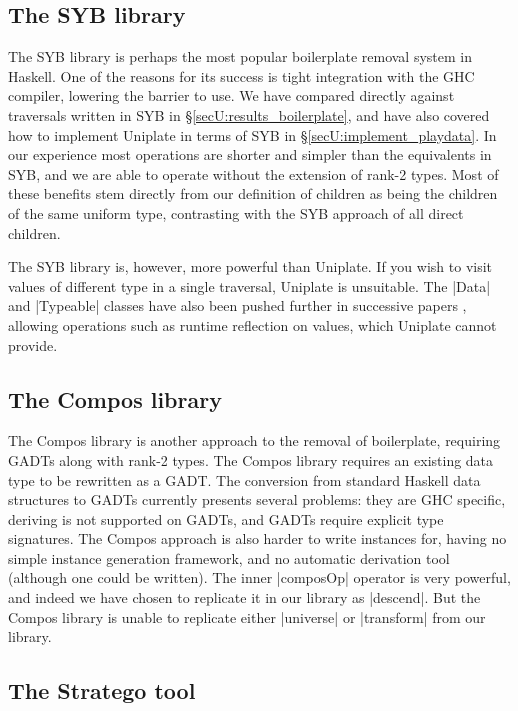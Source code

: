 \subsection{The SYB library}

The SYB library \citep{lammel:syb} is perhaps the most popular boilerplate removal system in Haskell. One of the reasons for its success is tight integration with the GHC compiler, lowering the barrier to use. We have compared directly against traversals written in SYB in \S\ref{secU:results_boilerplate}, and have also covered how to implement Uniplate in terms of SYB in \S\ref{secU:implement_playdata}. In our experience most operations are shorter and simpler than the equivalents in SYB, and we are able to operate without the extension of rank-2 types. Most of these benefits stem directly from our definition of children as being the children of the same uniform type, contrasting with the SYB approach of all direct children.

The SYB library is, however, more powerful than Uniplate. If you wish to visit values of different type in a single traversal, Uniplate is unsuitable. The |Data| and |Typeable| classes have also been pushed further in successive papers \citep{lammel:syb2,lammel:syb3}, allowing operations such as runtime reflection on values, which Uniplate cannot provide.

\subsection{The Compos library}

The Compos library \citep{bringert:compos} is another approach to the removal of boilerplate, requiring GADTs \citep{spj:gadt} along with rank-2 types. The Compos library requires an existing data type to be rewritten as a GADT. The conversion from standard Haskell data structures to GADTs currently presents several problems: they are GHC specific, deriving is not supported on GADTs, and GADTs require explicit type signatures. The Compos approach is also harder to write instances for, having no simple instance generation framework, and no automatic derivation tool (although one could be written). The inner |composOp| operator is very powerful, and indeed we have chosen to replicate it in our library as |descend|. But the Compos library is unable to replicate either |universe| or |transform| from our library.

\subsection{The Stratego tool}

